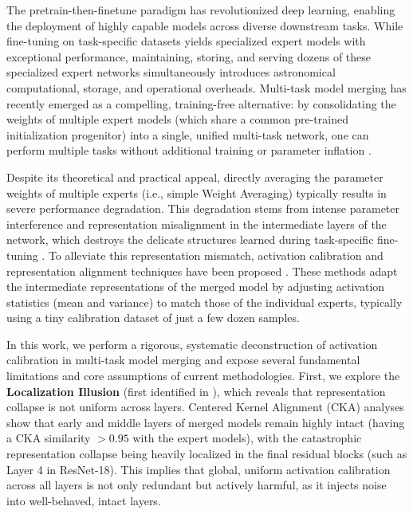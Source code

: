 \documentclass{article}
\theoremstyle{plain}
\theoremstyle{definition}
\theoremstyle{remark}
\begin{document}
The pretrain-then-finetune paradigm has revolutionized deep learning, enabling the deployment of highly capable models across diverse downstream tasks. While fine-tuning on task-specific datasets yields specialized expert models with exceptional performance, maintaining, storing, and serving dozens of these specialized expert networks simultaneously introduces astronomical computational, storage, and operational overheads. Multi-task model merging has recently emerged as a compelling, training-free alternative: by consolidating the weights of multiple expert models (which share a common pre-trained initialization progenitor) into a single, unified multi-task network, one can perform multiple tasks without additional training or parameter inflation \cite{tiesmerging2023, isonotask2025, della2024, modelingmultitask2025}.

Despite its theoretical and practical appeal, directly averaging the parameter weights of multiple experts (i.e., simple Weight Averaging) typically results in severe performance degradation. This degradation stems from intense parameter interference and representation misalignment in the intermediate layers of the network, which destroys the delicate structures learned during task-specific fine-tuning \cite{tiesmerging2023, whoeverstartedinterference2025}. To alleviate this representation mismatch, activation calibration and representation alignment techniques have been proposed \cite{submission3, submission7}. These methods adapt the intermediate representations of the merged model by adjusting activation statistics (mean and variance) to match those of the individual experts, typically using a tiny calibration dataset of just a few dozen samples.

In this work, we perform a rigorous, systematic deconstruction of activation calibration in multi-task model merging and expose several fundamental limitations and core assumptions of current methodologies. First, we explore the \textbf{Localization Illusion} (first identified in \cite{submission3}), which reveals that representation collapse is not uniform across layers. Centered Kernel Alignment (CKA) analyses show that early and middle layers of merged models remain highly intact (having a CKA similarity $> 0.95$ with the expert models), with the catastrophic representation collapse being heavily localized in the final residual blocks (such as Layer 4 in ResNet-18). This implies that global, uniform activation calibration across all layers is not only redundant but actively harmful, as it injects noise into well-behaved, intact layers.
\end{document}
